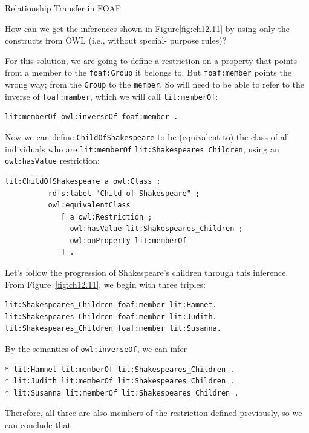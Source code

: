 \begin{challenge}{Relationship Transfer in FOAF}
\label{chal:26}

How can we get the inferences shown in Figure\ref{fig:ch12.11} by using only the
constructs from OWL (i.e., without special- purpose rules)?

\solution

For this solution, we are going to define a restriction on a property that points from a member to the \texttt{foaf:Group} it belongs to.  But \texttt{foaf:member} points the wrong way; from the \texttt{Group} to 
the \texttt{member}.  So 
will need to be able to refer to the inverse of \texttt{foaf:mamber}, which we will call \texttt{lit:memberOf}:

\begin{lstlisting}
lit:memberOf owl:inverseOf foaf:member .
\end{lstlisting}

Now we can define \texttt{ChildOfShakespeare} to be (equivalent to) the class of
all individuals who are
\texttt{lit:memberOf} \texttt{lit:Shakespeares\_Children}, using an \texttt{owl:hasValue} restriction:

\begin{lstlisting}
lit:ChildOfShakespeare a owl:Class ;
          rdfs:label "Child of Shakespeare" ;
          owl:equivalentClass
             [ a owl:Restriction ;
               owl:hasValue lit:Shakespeares_Children ;
               owl:onProperty lit:memberOf
             ] .
\end{lstlisting}

Let's follow the progression of Shakespeare's children through this
inference. From Figure~\ref{fig:ch12.11}, we begin with three triples:

\begin{lstlisting}
lit:Shakespeares_Children foaf:member lit:Hamnet.
lit:Shakespeares_Children foaf:member lit:Judith.
lit:Shakespeares_Children foaf:member lit:Susanna.
\end{lstlisting}

By the semantics of \texttt{owl:inverseOf}, we can infer

\begin{lstlisting}
* lit:Hamnet lit:memberOf lit:Shakespeares_Children .
* lit:Judith lit:memberOf lit:Shakespeares_Children .
* lit:Susanna lit:memberOf lit:Shakespeares_Children .
\end{lstlisting}

Therefore, all three are also members of the restriction defined
previously, so we can conclude that


\end{challenge}
